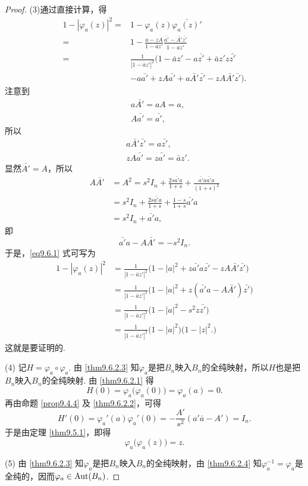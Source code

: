 \begin{proof}
  (3)通过直接计算，得
    \begin{equation}\label{eq9.6.1}
      \begin{aligned}
        1 - |\varphi_a(z)|^2 = {}& 1-\varphi_a(z) \bar{\varphi_a(z)'}\\
        = {}& 1 - \frac{a-zA}{1-\bar az'}\frac{\bar{a'} - \bar{A'}\bar{z'}}{1-a\bar{z'}}\\
        = {}& \frac1{|1-\bar az'|^2}(1-\bar az'-a\bar{z'} + \bar az'z\bar{z'}\\
        & - a\bar{a'}+zA\bar{a'}+a\bar{A'}\bar{z'} - zA\bar{A'}\bar{z'}).
      \end{aligned}
    \end{equation}
  注意到
  \begin{align*}
    & a\bar{A'} = aA = a,\\
    & A\bar{a'} = \bar{a'},
  \end{align*}
  所以
  \begin{align*}
    & a\bar{A'} \bar{z'} = a\bar{z'},\\
    & zA \bar{a'} = z\bar{a'} = \bar az'.
  \end{align*}
  显然$\bar{A'}=A$，所以
  \begin{align*}
    A\bar{A'} & = A^2 = s^2I_n + \frac{2s\bar{a'}a}{1+s} + \frac{\bar{a'}a\bar{a'}a}{(1+s)^2}\\
    & = s^2I_n + \frac{2s\bar{a'}a}{1+s} + \frac{1-s}{1+s}\bar{a'}a\\
    & = s^2I_n + \bar{a'}a,
  \end{align*}
  即
  \[
    \bar {a'}a - A\bar{A'} = -s^2I_n.
  \]
  于是，\eqref{eq9.6.1} 式可写为
  \begin{align*}
    1 - |\varphi_a(z)|^2 & = \frac1{|1-\bar az'|^2}\big(1-|a|^2+z\bar{a'}a\bar{z'}-
    zA\bar{A'}\bar{z'}\big)\\
    & = \frac1{|1-\bar az'|^2}\big(1-|a|^2 + z(\bar{a'}a-A\bar{A'})\bar{z'}\big)\\
    & = \frac1{|1-\bar az'|^2}\big(1-|a|^2 - s^2z\bar{z'}\big)\\
    & = \frac1{|1-\bar az'|^2}\big(1-|a|^2\big)\big(1-|z|^2\big.)
  \end{align*}
  这就是要证明的.

  (4) 记$H=\varphi_a\circ\varphi_a$. 由 \ref{thm9.6.2.3} 知$\varphi_a$是把$B_n$映入$B_n$的全纯映射，所以$H$也是把$B_n$映入$B_n$的全纯映射. 由 \ref{thm9.6.2.1} 得
  \[
    H(0) = \varphi_a\big(\varphi_a(0)\big) = \varphi_a(a) = 0.
  \]
  再由命题 \ref{prop9.4.4} 及 \ref{thm9.6.2.2}，可得
  \[
    H'(0) = \varphi_a'(a)\varphi_a'(0) = -\frac{A'}{s^2}(a'\bar a-A') = I_n.
  \]
  于是由定理 \ref{thm9.5.1}，即得
  \[
    \varphi_a\big(\varphi_a(z)\big) = z.
  \]

  (5) 由 \ref{thm9.6.2.3} 知$\varphi_a$是把$B_n$映入$B_n$的全纯映射，由 \ref{thm9.6.2.4} 知$\varphi_a^{-1}=\varphi_a$是全纯的，因而$\varphi_a\in\operatorname{Aut}(B_n)$.
\end{proof}

